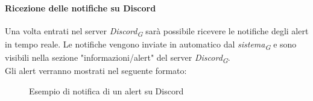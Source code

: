 \paragraph{Ricezione delle notifiche su Discord}
Una volta entrati nel server \textit{Discord}\textsubscript{\textit{G}} sarà possibile ricevere le notifiche degli alert in tempo reale. Le notifiche vengono inviate in automatico dal \textit{sistema}\textsubscript{\textit{G}} e sono visibili nella sezione "informazioni/alert" del server \textit{Discord}\textsubscript{\textit{G}}. \\
Gli alert verranno mostrati nel seguente formato:
\begin{figure}[H]
    \centering
    \caption{Esempio di notifica di un alert su Discord}
    \label{fig:my_label}
\end{figure} 